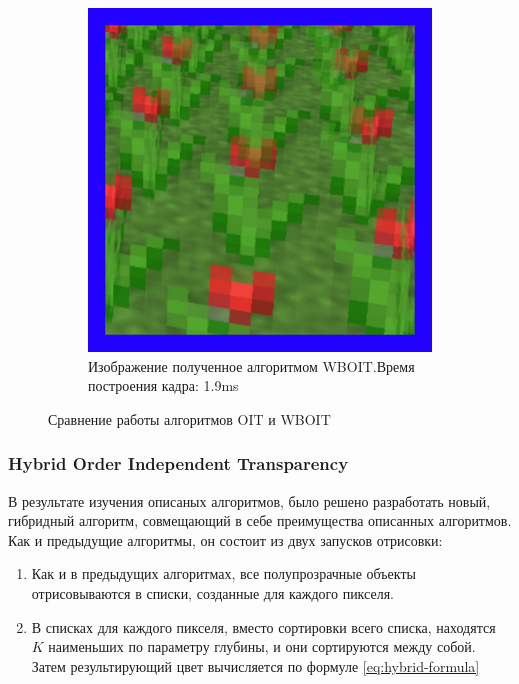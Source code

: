 \begin{figure}[!htbp]
\begin{subfigure}[b]{0.3\textwidth}
					\includegraphics[width=\textwidth]{my_folder/images//wboit_flower}
					\caption{Изображение полученное алгоритмом WBOIT.\linebreak Время построения кадра: 1.9ms}
					\label{fig:wboit_flower}
				\end{subfigure}				
				\captionsetup{justification=centering} %
				\caption{Сравнение работы алгоритмов OIT и WBOIT}\label{fig:oit_vs_wboit} 
			\end{figure}
			
		\subsubsection{Hybrid Order Independent Transparency} \label{ch3:render_pass:transparents:hybrid_oit}
			В результате изучения описаных алгоритмов, было решено разработать новый, гибридный алгоритм, совмещающий в себе преимущества описанных алгоритмов. Как и предыдущие алгоритмы, он состоит из двух запусков отрисовки:
			
			\begin{enumerate}[1.]
				\item Как и в предыдущих алгоритмах, все полупрозрачные объекты отрисовываются в списки, созданные для каждого пикселя.
				\item В списках для каждого пикселя, вместо сортировки всего списка, находятся $K$ наименьших по параметру глубины, и они сортируются между собой. Затем результирующий цвет вычисляется по формуле \ref{eq:hybrid-formula}
			\end{enumerate}
			
